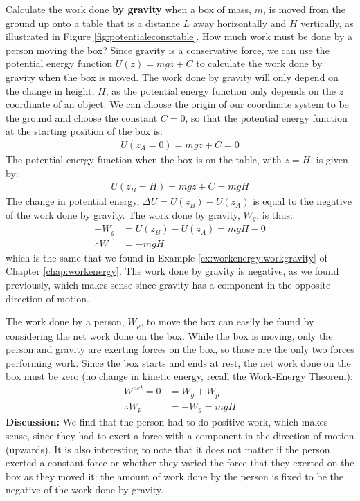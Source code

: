 \begin{example}{
Calculate the work done \textbf{by gravity} when a box of mass, $m$, is moved from the ground up onto a table that is a distance $L$ away horizontally and $H$ vertically, as illustrated in Figure \ref{fig:potentialecons:table}. How much work must be done by a person moving the box?}
Since gravity is a conservative force, we can use the potential energy function $U(z)=mgz+C$ to calculate the work done by gravity when the box is moved. The work done by gravity will only depend on the change in height, $H$, as the potential energy function only depends on the $z$ coordinate of an object.  We can choose the origin of our coordinate system to be the ground and choose the constant $C=0$, so that the potential energy function at the starting position of the box is:
\begin{align*}
U(z_A=0) = mgz+C= 0
\end{align*}
The potential energy function when the box is on the table, with $z=H$, is given by:
\begin{align*}
U(z_B=H) = mgz + C = mgH
\end{align*}
The change in potential energy, $\Delta U = U(z_B) - U(z_A)$ is equal to the negative of the work done by gravity. The work done by gravity, $W_g$, is thus:
\begin{align*}
-W_g &=  U(z_B) - U(z_A) = mgH - 0\\
\therefore W &= -mgH
\end{align*}
which is the same that we found in Example \ref{ex:workenergy:workgravity} of Chapter \ref{chap:workenergy}. The work done by gravity is negative, as we found previously, which makes sense since gravity has a component in the opposite direction of motion. 

The work done by a person, $W_p$, to move the box can easily be found by considering the net work done on the box. While the box is moving, only the person and gravity are exerting forces on the box, so those are the only two forces performing work. Since the box starts and ends at rest, the net work done on the box must be zero (no change in kinetic energy, recall the Work-Energy Theorem):
\begin{align*}
W^{net} = 0 &= W_g + W_p\\
\therefore W_p &= -W_g = mgH
\end{align*}
\textbf{Discussion:} We find that the person had to do positive work, which makes sense, since they had to exert a force with a component in the direction of motion (upwards). It is also interesting to note that it does not matter if the person exerted a constant force or whether they varied the force that they exerted on the box as they moved it: the amount of work done by the person is fixed to be the negative of the work done by gravity.
\end{example}

